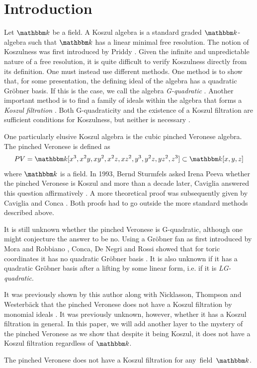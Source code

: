 \section{Introduction}
\noindent
Let $\K$ be a field. A Koszul algebra is a standard graded $\K$-algebra such that $\K$ has a linear minimal free resolution. The notion of Koszulness was first introduced by Priddy \cite{Priddy1970}. Given the infinite and unpredictable nature of a free resolution, it is quite difficult to verify Koszulness directly from its definition. One must instead use different methods. One method is to show that, for some presentation, the defining ideal of the algebra has a quadratic Gröbner basis. If this is the case, we call the algebra \emph{G-quadratic} \cite[Remark 2.6(4)]{conca2012koszulalgebrasregularity}. Another important method is to find a family of ideals within the algebra that forms a \emph{Koszul filtration} \cite{CTV2001}. Both G-quadraticity and the existence of a Koszul filtration are sufficient conditions for Koszulness, but neither is necessary \cite{CTV2001}.

One particularly elusive Koszul algebra is the cubic pinched Veronese algebra.
The pinched Veronese is defined as \[PV=\K [x^3,x^2y,xy^2,x^2z,xz^2,y^3,y^2z,yz^2,z^3]\subset \K[x,y,z]\] where $\K$ is a field. 
In 1993, Bernd Sturmfels asked Irena Peeva whether the pinched Veronese is Koszul and more than a decade later, Caviglia answered this question affirmatively \cite{Caviglia2009}. A more theoretical proof was subsequently given by Caviglia and Conca \cite{CC2013}. Both proofs had to go outside the more standard methods described above.

It is still unknown whether the pinched Veronese is G-quadratic, although one might conjecture the answer to be no. Using a Gröbner fan as first introduced by Mora and Robbiano \cite{mora_grobner_1988}, Conca, De Negri and Rossi showed that for toric coordinates it has no quadratic Gröbner basis \cite{conca2012koszulalgebrasregularity}. It is also unknown if it has a quadratic Gröbner basis after a lifting by some linear form, i.e. if it is \emph{LG-quadratic}. 

It was previously shown by this author along with Nicklasson, Thompson and Westerbäck that the pinched Veronese does not have a Koszul filtration by monomial ideals \cite{berghofer2026con}. It was previously unknown, however, whether it has a Koszul filtration in general. In this paper, we will add another layer to the mystery of the pinched Veronese as we show that despite it being Koszul, it does not have a Koszul filtration regardless of $\K$.



\begin{theorem*}\label{bigone}The pinched Veronese does not have a Koszul filtration for any~field~$\K$.
\end{theorem*}